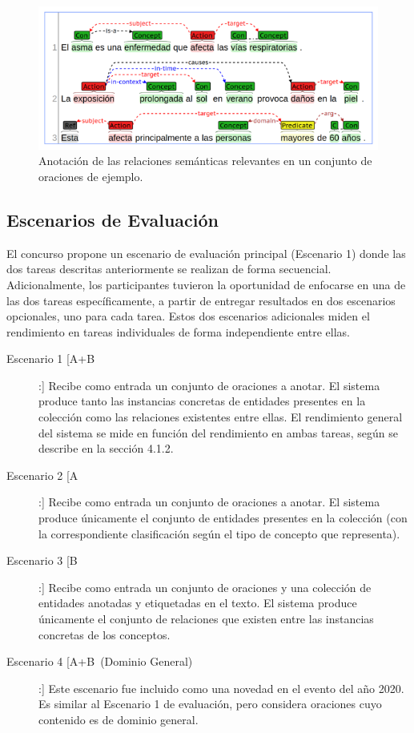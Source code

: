 \begin{figure}[h!]
	\centering
	\includegraphics[width=0.9\linewidth]{Graphics/relations.png}
	\caption{Anotación de las relaciones semánticas relevantes en un conjunto de oraciones de ejemplo.} \label{fig:relations_ex}
\end{figure}


\subsection{Escenarios de Evaluación}\label{subsec:eval_sce}

El concurso propone un escenario de evaluación principal (Escenario 1) donde las dos tareas descritas anteriormente se realizan de forma secuencial.
Adicionalmente, los participantes tuvieron la oportunidad de enfocarse en una de las dos tareas específicamente, a partir de entregar resultados en dos escenarios opcionales, uno para cada tarea.
Estos dos escenarios adicionales miden el rendimiento en tareas individuales de forma independiente entre ellas.

\begin{description}
	
\item[Escenario 1 [A+B]:] Recibe como entrada un conjunto de oraciones a anotar.
El sistema produce tanto las instancias concretas de entidades
presentes en la colección como las relaciones existentes entre ellas.
El rendimiento general del sistema se mide en función
del rendimiento en ambas tareas, según se describe en la sección 4.1.2.
 
\item[Escenario 2 [A]:] Recibe como entrada un conjunto de oraciones a anotar.
El sistema produce únicamente el conjunto de entidades presentes en la colección (con la correspondiente clasificación según el tipo de concepto que representa).

\item[Escenario 3 [B]:] Recibe como entrada un conjunto de oraciones y una colección de entidades anotadas y etiquetadas en el texto.
El sistema produce únicamente el conjunto de relaciones que existen entre las instancias concretas de los conceptos.

\item[Escenario 4 [A+B~(Dominio General)]:] Este escenario fue incluido como una novedad en el evento del año 2020.
Es similar al Escenario 1 de evaluación, pero considera oraciones cuyo contenido es de dominio general.

\end{description}

